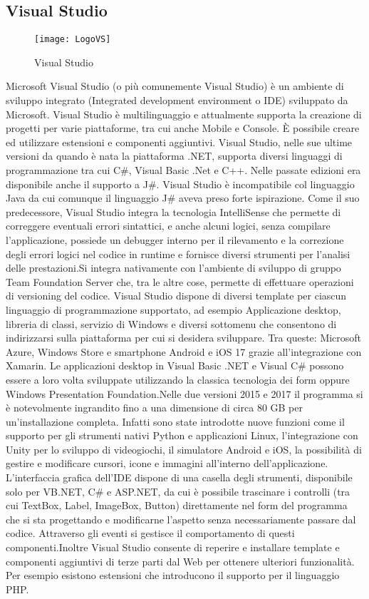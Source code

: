 \subsection{Visual Studio}
\begin{figure}[htpb!]
\center
  \texttt{[image: LogoVS]}
  \caption{Visual Studio}
\end{figure}
Microsoft Visual Studio (o più comunemente Visual Studio) è un ambiente di sviluppo integrato (Integrated development environment o IDE) sviluppato da Microsoft.
Visual Studio è multilinguaggio e attualmente supporta la creazione di progetti per varie piattaforme, tra cui anche Mobile e Console. È possibile creare ed utilizzare estensioni e componenti aggiuntivi.
Visual Studio, nelle sue ultime versioni da quando è nata la piattaforma .NET, supporta diversi linguaggi di programmazione tra cui C\#, Visual Basic .Net e C++. Nelle passate edizioni era disponibile anche il supporto a J\#. Visual Studio è incompatibile col linguaggio Java da cui comunque il linguaggio J\# aveva preso forte ispirazione.
Come il suo predecessore, Visual Studio integra la tecnologia IntelliSense che permette di correggere eventuali errori sintattici, e anche alcuni logici, senza compilare l'applicazione, possiede un debugger interno per il rilevamento e la correzione degli errori logici nel codice in runtime e fornisce diversi strumenti per l'analisi delle prestazioni.Si integra nativamente con l'ambiente di sviluppo di gruppo Team Foundation Server che, tra le altre cose, permette di effettuare operazioni di versioning del codice.
Visual Studio dispone di diversi template per ciascun linguaggio di programmazione supportato, ad esempio Applicazione desktop, libreria di classi, servizio di Windows e diversi sottomenu che consentono di indirizzarsi sulla piattaforma per cui si desidera sviluppare. Tra queste: Microsoft Azure, Windows Store e smartphone Android e iOS
17
grazie all'integrazione con Xamarin. Le applicazioni desktop in Visual Basic .NET e Visual C\# possono essere a loro volta sviluppate utilizzando la classica tecnologia dei form oppure Windows Presentation Foundation.Nelle due versioni 2015 e 2017 il programma si è notevolmente ingrandito fino a una dimensione di circa 80 GB per un'installazione completa. Infatti sono state introdotte nuove funzioni come il supporto per gli strumenti nativi Python e applicazioni Linux, l'integrazione con Unity per lo sviluppo di videogiochi, il simulatore Android e iOS, la possibilità di gestire e modificare cursori, icone e immagini all'interno dell'applicazione.
L'interfaccia grafica dell'IDE dispone di una casella degli strumenti, disponibile solo per VB.NET, C\# e ASP.NET, da cui è possibile trascinare i controlli (tra cui TextBox, Label, ImageBox, Button) direttamente nel form del programma che si sta progettando e modificarne l'aspetto senza necessariamente passare dal codice. Attraverso gli eventi si gestisce il comportamento di questi componenti.Inoltre Visual Studio consente di reperire e installare template e componenti aggiuntivi di terze parti dal Web per ottenere ulteriori funzionalità. Per esempio esistono estensioni che introducono il supporto per il linguaggio PHP.
